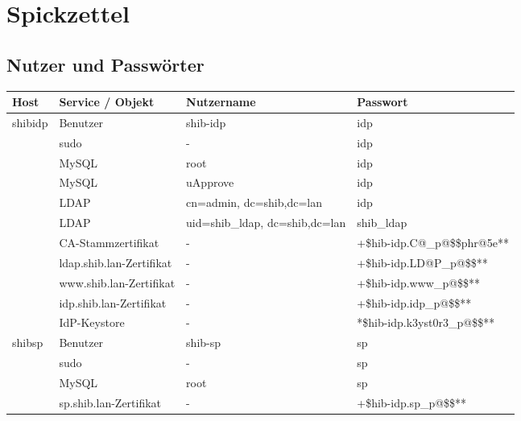 \section{Spickzettel}\label{sec:spickzettel}
\subsection{Nutzer und Passwörter}

\begin{center}
	\begin{tabular}{| l | l | p{4cm} | l | }
		\hline
		Host & Service / Objekt & Nutzername & Passwort\\ \hline \hline
		\multirow{11}{*}{shibidp} 
		 & Benutzer & shib-idp & idp \\ \cline{2-4}
		 & sudo & - & idp \\ \cline{2-4}
		 & MySQL & root & idp \\ \cline{2-4}
		 & MySQL & uApprove & idp \\ \cline{2-4}
		 & LDAP & cn=admin, dc=shib,dc=lan & idp \\ \cline{2-4}
		 & LDAP & uid=shib\_ldap, dc=shib,dc=lan & shib\_ldap \\ \cline{2-4}
		 & CA-Stammzertifikat & - & +\$hib-idp.C@\_p@\$\$phr@5e** \\ \cline{2-4}
		 & ldap.shib.lan-Zertifikat & - & +\$hib-idp.LD@P\_p@\$\$** \\ \cline{2-4}
		 & www.shib.lan-Zertifikat & - & +\$hib-idp.www\_p@\$\$** \\ \cline{2-4}
		 & idp.shib.lan-Zertifikat & - & +\$hib-idp.idp\_p@\$\$** \\ \cline{2-4}
		 & IdP-Keystore & - & *\$hib-idp.k3yst0r3\_p@\$\$** \\ \hline
		\hline
		\multirow{4}{*}{shibsp} 
		 & Benutzer & shib-sp & sp \\ \cline{2-4}
		 & sudo & - & sp \\ \cline{2-4}
		 & MySQL & root & sp \\ \cline{2-4}
		 & sp.shib.lan-Zertifikat & - & +\$hib-idp.sp\_p@\$\$** \\ \hline
	\end{tabular}
\end{center}

